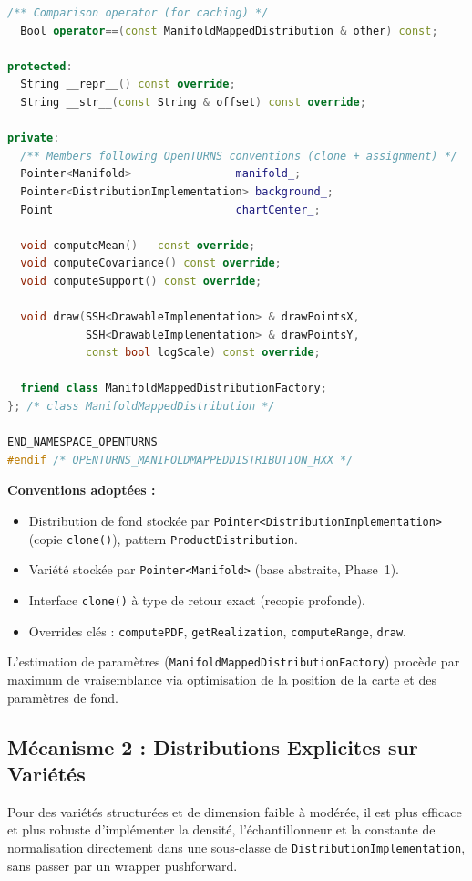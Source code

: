 \documentclass[11pt,a4paper]{article}
\begin{document}
\begin{lstlisting}[language=C++,
    caption={Blueprint \texttt{ManifoldMappedDistribution} dans OpenTURNS},
    label={lst:manifold-mapped}]
  /** Comparison operator (for caching) */
  Bool operator==(const ManifoldMappedDistribution & other) const;

protected:
  String __repr__() const override;
  String __str__(const String & offset) const override;

private:
  /** Members following OpenTURNS conventions (clone + assignment) */
  Pointer<Manifold>                manifold_;
  Pointer<DistributionImplementation> background_;
  Point                            chartCenter_;

  void computeMean()   const override;
  void computeCovariance() const override;
  void computeSupport() const override;

  void draw(SSH<DrawableImplementation> & drawPointsX,
            SSH<DrawableImplementation> & drawPointsY,
            const bool logScale) const override;

  friend class ManifoldMappedDistributionFactory;
}; /* class ManifoldMappedDistribution */

END_NAMESPACE_OPENTURNS
#endif /* OPENTURNS_MANIFOLDMAPPEDDISTRIBUTION_HXX */
\end{lstlisting}

\textbf{Conventions adoptées :}
\begin{itemize}
    \item Distribution de fond stockée par \texttt{Pointer<DistributionImplementation>} (copie \texttt{clone()}), pattern \texttt{ProductDistribution}.
    \item Variété stockée par \texttt{Pointer<Manifold>} (base abstraite, Phase~1).
    \item Interface \texttt{clone()} à type de retour exact (recopie profonde).
    \item Overrides clés : \texttt{computePDF}, \texttt{getRealization}, \texttt{computeRange}, \texttt{draw}.
\end{itemize}

L'estimation de paramètres (\texttt{ManifoldMappedDistributionFactory}) procède par maximum de vraisemblance via optimisation de la position de la carte et des paramètres de fond.

\subsection{Mécanisme 2 : Distributions Explicites sur Variétés}

Pour des variétés structurées et de dimension faible à modérée, il est plus efficace et plus robuste d'implémenter la densité, l'échantillonneur et la constante de normalisation directement dans une sous-classe de \texttt{DistributionImplementation}, sans passer par un wrapper pushforward.
\end{document}
